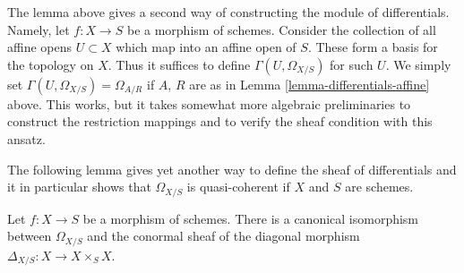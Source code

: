 \begin{remark}
\label{remark-differentials-glue}
The lemma above gives a second way of constructing the module of
differentials. Namely, let $f : X \to S$ be a morphism of schemes.
Consider the collection of all affine opens $U \subset X$ which
map into an affine open of $S$. These form a basis for the topology
on $X$. Thus it suffices to define $\Gamma(U, \Omega_{X/S})$
for such $U$. We simply set $\Gamma(U, \Omega_{X/S}) = \Omega_{A/R}$ if
$A$, $R$ are as in Lemma \ref{lemma-differentials-affine} above.
This works, but it takes somewhat more algebraic preliminaries
to construct the restriction mappings and to verify the sheaf
condition with this ansatz.
\end{remark}

\noindent
The following lemma gives yet another way to define the sheaf of
differentials and it in particular shows that $\Omega_{X/S}$
is quasi-coherent if $X$ and $S$ are schemes.

\begin{lemma}
\label{lemma-differentials-diagonal}
Let $f : X \to S$ be a morphism of schemes. There is a canonical
isomorphism between $\Omega_{X/S}$ and the conormal sheaf of
the diagonal morphism $\Delta_{X/S} : X \longrightarrow X \times_S X$.
\end{lemma}

